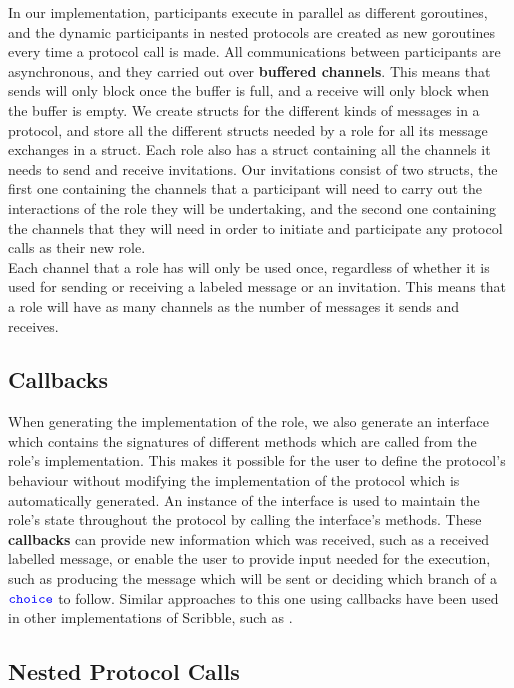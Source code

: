 \documentclass[12pt,twoside]{report}
\begin{document}
In our implementation, participants execute in parallel as different goroutines, and the dynamic participants in nested protocols are created as new goroutines every time a protocol call is made. All communications between participants are asynchronous, and they carried out over \textbf{buffered channels}. This means that sends will only block once the buffer is full, and a receive will only block when the buffer is empty. We create structs for the different kinds of messages in a protocol, and store all the different structs needed by a role for all its message exchanges in a struct. Each role also has a struct containing all the channels it needs to send and receive invitations. Our invitations consist of two structs, the first one containing the channels that a participant will need to carry out the interactions of the role they will be undertaking, and the second one containing the channels that they will need in order to initiate and participate any protocol calls as their new role. \\

Each channel that a role has will only be used once, regardless of whether it is used for sending or receiving a labeled message or an invitation. This means that a role will have as many channels as the number of messages it sends and receives.

\subsection{Callbacks}
When generating the implementation of the role, we also generate an interface which contains the signatures of different methods which are called from the role's implementation. This makes it possible for the user to define the protocol's behaviour without modifying the implementation of the protocol which is automatically generated. An instance of the interface is used to maintain the role's state throughout the protocol by calling the interface's methods. These \textbf{callbacks} can provide new information which was received, such as a received labelled message, or enable the user to provide input needed for the execution, such as producing the message which will be sent or deciding which branch of a ${\color{blue}\mathtt{choice}}$ to follow. Similar approaches to this one using callbacks have been used in other implementations of Scribble, such as \cite{scribble-callbacks}.

\subsection{Nested Protocol Calls}
\end{document}
